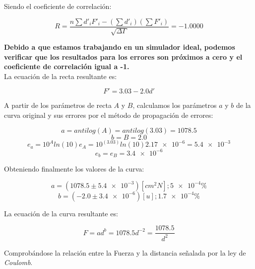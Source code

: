 \documentclass[letter,11pt]{article}
\begin{document}
Siendo el coeficiente de correlación:

\begin{equation*}
    R = \frac{n \sum d'_i F'_i - (\sum d'_i)(\sum F'_i)}{\sqrt{\Delta \Gamma}} = -1.0000
\end{equation*}

\textbf{Debido a que estamos trabajando en un simulador ideal, podemos verificar
que los resultados para los errores son próximos a cero y el coeficiente de
correlación igual a -1.}
\\

La ecuación de la recta resultante es:

\begin{equation*}
    F' = 3.03 - 2.0 d'
\end{equation*}

A partir de los parámetros de recta $A$ y $B$, calculamos los parámetros $a$ y
$b$ de la curva original y sus errores por el método de propagación de errores:

\begin{equation*}
    a = antilog(A) = antilog(3.03) = 1078.5
\end{equation*}
\begin{equation*}
    b = B = 2.0
\end{equation*}
\begin{equation*}
    e_a = 10^A ln(10) e_A = 10^{(3.03)} ln(10) \num{2.17e-6} = \num{5.4e-3}
\end{equation*}
\begin{equation*}
    e_b = e_B = \num{3.4e-6}
\end{equation*}

Obteniendo finalmente los valores de la curva:

\begin{equation*}
    a = (1078.5 \pm \num{5.4e-3})[cm^2 N]; \num{5e-4}\%
\end{equation*}
\begin{equation*}
    b = (-2.0 \pm \num{3.4e-6})[u]; \num{1.7e-4}\%
\end{equation*}

La ecuación de la curva resultante es:

\begin{equation}
    F = a d^b = 1078.5 d^{-2} = \frac{1078.5}{d^2}
\label{curva}
\end{equation}

Comprobándose la relación entre la Fuerza y la distancia señalada por la ley de
\emph{Coulomb}.
\end{document}
